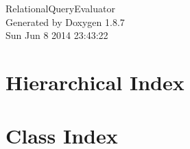 \documentclass[twoside]{book}
\newcommand{\+}{\discretionary{\mbox{\scriptsize$\hookleftarrow$}}{}{}}
\newcommand{\clearemptydoublepage}{%
  \newpage{\pagestyle{empty}\cleardoublepage}%
}
\begin{document}
\hypersetup{pageanchor=false,
             bookmarks=true,
             bookmarksnumbered=true,
             pdfencoding=unicode
            }
\begin{titlepage}
\vspace*{7cm}
\begin{center}%
{\Large Relational\+Query\+Evaluator }\\
\vspace*{1cm}
{\large Generated by Doxygen 1.8.7}\\
\vspace*{0.5cm}
{\small Sun Jun 8 2014 23:43:22}\\
\end{center}
\end{titlepage}
\clearemptydoublepage
\tableofcontents
\clearemptydoublepage
{}
\hypersetup{pageanchor=true}

\chapter{Hierarchical Index}

\chapter{Class Index}

\end{document}
